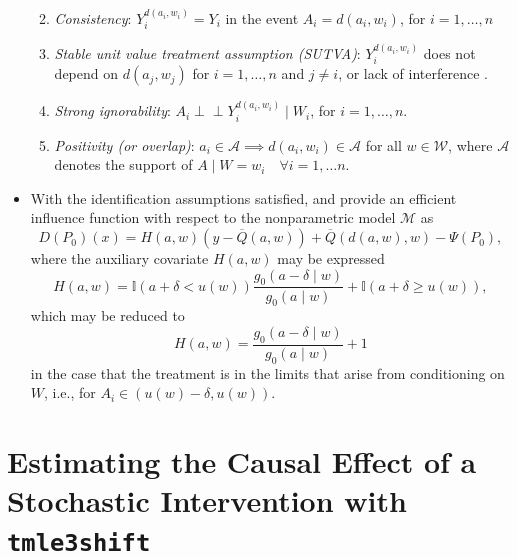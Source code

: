 \documentclass[
  12pt, krantz2,
]{book}
\providecommand{\tightlist}{%
  \setlength{\itemsep}{0pt}\setlength{\parskip}{0pt}}
\theoremstyle{definition}
\theoremstyle{definition}
\theoremstyle{definition}
\newcommand{\1}{\mathbbm{1}}
\begin{document}
\begin{itemize}
  \begin{enumerate}
  \def\labelenumi{\arabic{enumi}.}
  \tightlist
  \item
    \emph{Consistency}: \(Y^{d(a_i, w_i)}_i = Y_i\) in the event \(A_i = d(a_i, w_i)\),
    for \(i = 1, \ldots, n\)
  \item
    \emph{Stable unit value treatment assumption (SUTVA)}: \(Y^{d(a_i, w_i)}_i\) does
    not depend on \(d(a_j, w_j)\) for \(i = 1, \ldots, n\) and \(j \neq i\), or lack
    of interference \citep{rubin1978bayesian, rubin1980randomization}.
  \item
    \emph{Strong ignorability}: \(A_i \perp \!\!\! \perp Y^{d(a_i, w_i)}_i \mid W_i\),
    for \(i = 1, \ldots, n\).
  \item
    \emph{Positivity (or overlap)}: \(a_i \in \mathcal{A} \implies d(a_i, w_i) \in \mathcal{A}\) for all \(w \in \mathcal{W}\), where \(\mathcal{A}\) denotes the
    support of \(A \mid W = w_i \quad \forall i = 1, \ldots n\).
  \end{enumerate}
\item
  With the identification assumptions satisfied, \citet{diaz2012population} and
  \citet{diaz2018stochastic} provide an efficient influence function with respect to
  the nonparametric model \(\mathcal{M}\) as
  \begin{equation*}\label{eqn:eif}
    D(P_0)(x) = H(a, w)({y - \overline{Q}(a, w)}) +
    \overline{Q}(d(a, w), w) - \Psi(P_0),
  \end{equation*}
  where the auxiliary covariate \(H(a,w)\) may be expressed
  \begin{equation*}\label{eqn:aux_covar_full}
    H(a,w) = \mathbb{I}(a + \delta < u(w)) \frac{g_0(a - \delta \mid w)} {g_0(a \mid w)}
      + \mathbb{I}(a + \delta \geq u(w)),
  \end{equation*}
  which may be reduced to
  \begin{equation*}\label{eqn:aux_covar_simple}
    H(a,w) = \frac{g_0(a - \delta \mid w)}{g_0(a \mid w)} + 1
  \end{equation*}
  in the case that the treatment is in the limits that arise from conditioning
  on \(W\), i.e., for \(A_i \in (u(w) - \delta, u(w))\).
\end{itemize}

\hypertarget{estimating-the-causal-effect-of-a-stochastic-intervention-with-tmle3shift}{%
\section{\texorpdfstring{Estimating the Causal Effect of a Stochastic Intervention with \texttt{tmle3shift}}{Estimating the Causal Effect of a Stochastic Intervention with tmle3shift}}\label{estimating-the-causal-effect-of-a-stochastic-intervention-with-tmle3shift}}
\end{document}
